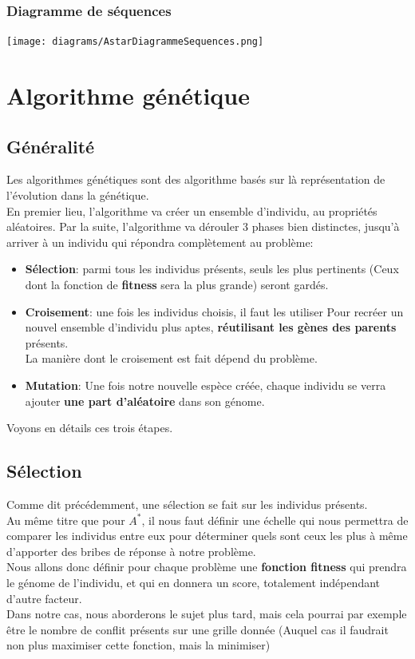 \subsubsection{Diagramme de séquences}

\texttt{[image: diagrams/AstarDiagrammeSequences.png]}



    \section{Algorithme génétique}
        \subsection{Généralité}
            Les algorithmes génétiques sont des algorithme basés sur là représentation de l'évolution dans la génétique.\\
            En premier lieu, l'algorithme va créer un ensemble d'individu, au propriétés aléatoires.
            Par la suite, l'algorithme va dérouler 3 phases bien distinctes, jusqu'à arriver à un individu qui répondra complètement au problème: 
            \begin{itemize}
                \item \textbf{Sélection}: parmi tous les individus présents, seuls les plus pertinents (Ceux dont la fonction de \textbf{fitness} sera la plus grande) seront gardés.
                \item \textbf{Croisement}: une fois les individus choisis, il faut les utiliser Pour recréer un nouvel ensemble d'individu plus aptes, \textbf{réutilisant les gènes des parents} présents.\\
                    La manière dont le croisement est fait dépend du problème.
                \item \textbf{Mutation}: Une fois notre nouvelle espèce créée, chaque individu se verra ajouter \textbf{une part d'aléatoire} dans son génome.
            \end{itemize}
            Voyons en détails ces trois étapes.
        \subsection{Sélection}
            Comme dit précédemment, une sélection se fait sur les individus présents.\\
            Au même titre que pour $A^*$, il nous faut définir une échelle qui nous permettra de comparer les individus entre eux pour déterminer quels sont ceux les plus à même d'apporter des bribes de réponse à notre problème.\\
            Nous allons donc définir pour chaque problème une \textbf{fonction fitness} qui prendra le génome de l'individu, et qui en donnera un score, totalement indépendant d'autre facteur.\\
            Dans notre cas, nous aborderons le sujet plus tard, mais cela pourrai par exemple être le nombre de conflit présents sur une grille donnée (Auquel cas il faudrait non plus maximiser cette fonction, mais la minimiser)

